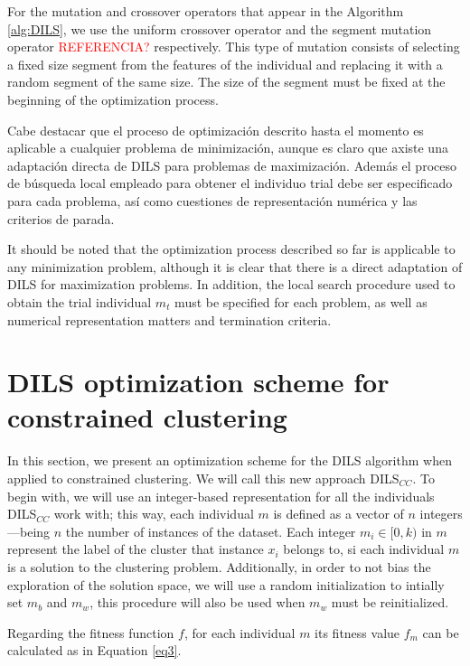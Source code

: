 \documentclass[review]{elsarticle}
\begin{document}
For the mutation and crossover operators that appear in the Algorithm \ref{alg:DILS}, we use the uniform crossover operator \cite{spears1995virtues} and the segment mutation operator \textcolor{red}{REFERENCIA?} respectively. This type of mutation consists of selecting a fixed size segment from the features of the individual and replacing it with a random segment of the same size. The size of the segment must be fixed at the beginning of the optimization process.

Cabe destacar que el proceso de optimización descrito hasta el momento es aplicable a cualquier problema de minimización, aunque es claro que axiste una adaptación directa de DILS para problemas de maximización. Además el proceso de búsqueda local empleado para obtener el individuo trial debe ser especificado para cada problema, así como cuestiones de representación numérica y las criterios de parada.

It should be noted that the optimization process described so far is applicable to any minimization problem, although it is clear that there is a direct adaptation of DILS for maximization problems. In addition, the local search procedure used to obtain the trial individual $m_t$ must be specified for each problem, as well as numerical representation matters and termination criteria.

\section{DILS optimization scheme for constrained clustering}

In this section, we present an optimization scheme for the DILS algorithm when applied to constrained clustering. We will call this new approach DILS$_{CC}$. To begin with, we will use an integer-based representation for all the individuals DILS$_{CC}$ work with; this way, each individual $m$ is defined as a vector of $n$ integers---being $n$ the number of instances of the dataset. Each integer $m_i \in [0,k)$ in $m$ represent the label of the cluster that instance $x_i$ belongs to, si each individual $m$ is a solution to the clustering problem. Additionally, in order to not bias the exploration of the solution space, we will use a random initialization to intially set $m_b$ and $m_w$, this procedure will also be used when $m_w$ must be reinitialized.

Regarding the fitness function $f$, for each individual $m$ its fitness value $f_m$ can be calculated as in Equation \ref{eq3}.
\end{document}
